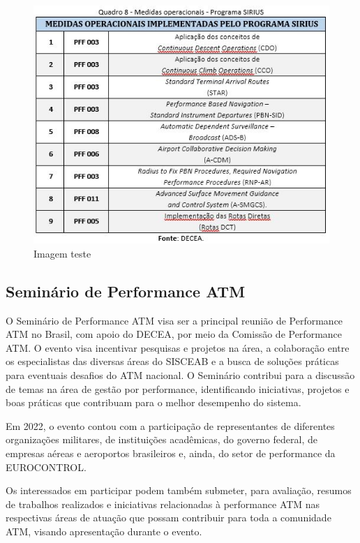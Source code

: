\documentclass[
]{book}
\begin{document}
\begin{figure}
\centering
\includegraphics{imagens/fig37.jpg}
\caption{Imagem teste}
\end{figure}

\hypertarget{seminuxe1rio-de-performance-atm}{%
\subsection{Seminário de Performance ATM}\label{seminuxe1rio-de-performance-atm}}

O Seminário de Performance ATM visa ser a principal reunião de Performance ATM no Brasil, com apoio do DECEA, por meio da Comissão de Performance ATM. O evento visa incentivar pesquisas e projetos na área, a colaboração entre os especialistas das diversas áreas do SISCEAB e a busca de soluções práticas para eventuais desafios do ATM nacional. O Seminário contribui para a discussão de temas na área de gestão por performance, identificando iniciativas, projetos e boas práticas que contribuam para o melhor desempenho do sistema.

Em 2022, o evento contou com a participação de representantes de diferentes organizações militares, de instituições acadêmicas, do governo federal, de empresas aéreas e aeroportos brasileiros e, ainda, do setor de performance da EUROCONTROL.

Os interessados em participar podem também submeter, para avaliação, resumos de trabalhos realizados e iniciativas relacionadas à performance ATM nas respectivas áreas de atuação que possam contribuir para toda a comunidade ATM, visando apresentação durante o evento.
\end{document}
